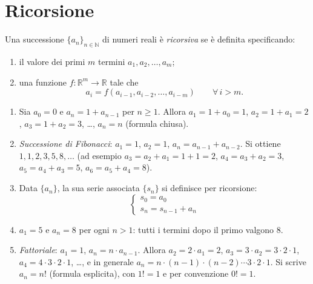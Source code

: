 \documentclass[11pt,a4paper]{article}
\begin{document}
\section{Ricorsione}

\begin{definizione}
Una successione $\{a_n\}_{n \in \mathbb{N}}$ di numeri reali è
\emph{ricorsiva} se è definita specificando:
\begin{enumerate}
    \item il valore dei primi $m$ termini $a_1, a_2, \dots, a_m$;
    \item una funzione $f \colon \mathbb{R}^m \to \mathbb{R}$ tale che
          \[
            a_i = f(a_{i-1}, a_{i-2}, \dots, a_{i-m}) \qquad \forall\, i > m .
          \]
\end{enumerate}
\end{definizione}

\begin{esempio}
\begin{enumerate}
    \item Sia $a_0 = 0$ e $a_n = 1 + a_{n-1}$ per $n \geq 1$. Allora
          $a_1 = 1 + a_0 = 1$, $a_2 = 1 + a_1 = 2$, $a_3 = 1 + a_2 = 3$, \dots,
          $a_n = n$ (formula chiusa).
    \item \emph{Successione di Fibonacci}: $a_1 = 1$, $a_2 = 1$,
          $a_n = a_{n-1} + a_{n-2}$. Si ottiene $1, 1, 2, 3, 5, 8, \dots$
          (ad esempio $a_3 = a_2 + a_1 = 1 + 1 = 2$, $a_4 = a_3 + a_2 = 3$,
          $a_5 = a_4 + a_3 = 5$, $a_6 = a_5 + a_4 = 8$).
    \item Data $\{a_n\}$, la sua serie associata $\{s_n\}$ si definisce per
          ricorsione:
          \[
            \begin{cases}
              s_0 = a_0\\
              s_n = s_{n-1} + a_n
            \end{cases}
          \]
    \item $a_1 = 5$ e $a_n = 8$ per ogni $n > 1$: tutti i termini dopo il primo
          valgono $8$.
    \item \emph{Fattoriale}: $a_1 = 1$, $a_n = n \cdot a_{n-1}$. Allora
          $a_2 = 2 \cdot a_1 = 2$, $a_3 = 3 \cdot a_2 = 3 \cdot 2 \cdot 1$,
          $a_4 = 4 \cdot 3 \cdot 2 \cdot 1$, \dots, e in generale
          $a_n = n \cdot (n-1) \cdot (n-2) \cdots 3 \cdot 2 \cdot 1$.
          Si scrive $a_n = n!$ (formula esplicita), con $1! = 1$ e per
          convenzione $0! = 1$.
\end{enumerate}
\end{esempio}
\end{document}
